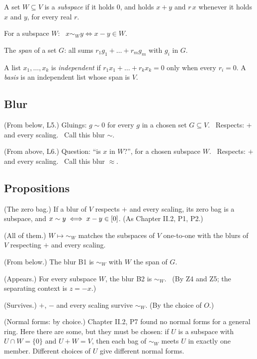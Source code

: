 \begin{lines}
\item[\lab{D4}] A set $W \subseteq V$ is a \emph{subspace} if it holds $0$, and holds $x + y$ and $r\,x$ whenever it holds $x$ and $y$, for every real $r$.
\item[\lab{D5}] For a subspace $W$: \ $x \sim_W y \iff x - y \in W$.
\item[\lab{D6}] The \emph{span} of a set $G$: all sums $r_1 g_1 + \dots + r_m g_m$ with $g_i$ in $G$.
\item[\lab{D7}] A list $x_1, \dots, x_k$ is \emph{independent} if $r_1 x_1 + \dots + r_k x_k = 0$ only when every $r_i = 0$. A \emph{basis} is an independent list whose span is $V$.
\end{lines}

\subsection*{Blur}

\begin{lines}
\item[\lab{B1}] (From below, L5.) Gluings: $g \sim 0$ for every $g$ in a chosen set $G \subseteq V$. \ Respects: $+$ and every scaling. \ Call this blur $\sim$.
\item[\lab{B2}] (From above, L6.) Question: ``is $x$ in $W$?'', for a chosen subspace $W$. \ Respects: $+$ and every scaling. \ Call this blur $\approx$.
\end{lines}

\subsection*{Propositions}

\begin{lines}
\item[\lab{P3}] (The zero bag.) If a blur of $V$ respects $+$ and every scaling, its zero bag is a subspace, and $x \sim y \iff x - y \in [0]$. (As Chapter II.2, P1, P2.)
\item[\lab{P4}] (All of them.) $W \mapsto {\sim_W}$ matches the subspaces of $V$ one-to-one with the blurs of $V$ respecting $+$ and every scaling.
\item[\lab{P5}] (From below.) The blur B1 is $\sim_W$ with $W$ the span of $G$.
\item[\lab{P6}] (Appears.) For every subspace $W$, the blur B2 is $\sim_W$. \ (By Z4 and Z5; the separating context is $z = -x$.)
\item[\lab{P7}] (Survives.) $+$, $-$ and every scaling survive $\sim_W$. (By the choice of $O$.)
\item[\lab{P8}] (Normal forms: by choice.) Chapter II.2, P7 found no normal forms for a general ring. Here there are some, but they must be chosen: if $U$ is a subspace with $U \cap W = \{0\}$ and $U + W = V$, then each bag of $\sim_W$ meets $U$ in exactly one member. Different choices of $U$ give different normal forms.
\end{lines}

